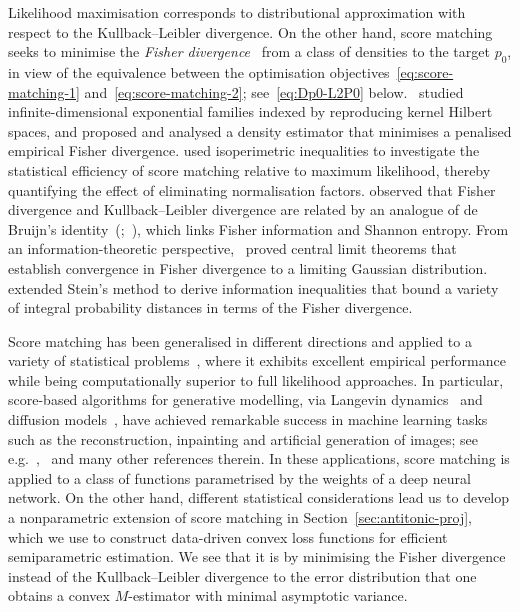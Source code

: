 \documentclass[a4paper]{article}
\theoremstyle{definition}
\begin{document}
Likelihood maximisation corresponds to distributional approximation with respect to the Kullback--Leibler divergence.  On the other hand, score matching seeks to minimise the \textit{Fisher divergence}~\citep[Section~1.3]{johnson2004information} from a class of densities to the target $p_0$, in view of the equivalence between the optimisation objectives~\eqref{eq:score-matching-1} and~\eqref{eq:score-matching-2}; see~\eqref{eq:Dp0-L2P0} below.~\citet{sriperumbudur2017density} studied infinite-dimensional exponential families indexed by reproducing kernel Hilbert spaces, and proposed and analysed a density estimator that minimises a penalised empirical Fisher divergence. \citet{koehler2022statistical} used isoperimetric inequalities to investigate the statistical efficiency of score matching relative to maximum likelihood, thereby quantifying the effect of eliminating normalisation factors. \citet{lyu2012interpretation}
observed that Fisher divergence and Kullback--Leibler divergence are related by an analogue of de Bruijn's identity~(\citealp[Appendix~C]{johnson2004information};~\citealp[Section~17.7]{cover2006elements}), which links Fisher information and Shannon entropy. From an information-theoretic perspective,~\citet{johnson2004fisher} proved central limit theorems that establish convergence in Fisher divergence to a limiting Gaussian distribution.~\citet{ley2013stein} extended Stein's method to derive information inequalities that bound a variety of integral probability distances in terms of the Fisher divergence.

Score matching has been generalised in different directions and applied to 
a variety of statistical problems~\citep[e.g.][]{hyvarinen2007extensions,vincent2011connection,lyu2012interpretation,mardia2016score,song2020sliced,yu2020simultaneous,yu2022generalized,lederer2023extremes,benton2024denoising,ghosh2025stein}, where it exhibits excellent empirical performance while being computationally superior to full likelihood approaches. In particular, score-based algorithms for generative modelling, via Langevin dynamics~\citep{song19generative} and diffusion models~\citep{song21score}, have achieved remarkable success in machine learning tasks such as the reconstruction, inpainting and artificial generation of images; see e.g.~\citet{jolicoeur2020adversarial},~\citet{bortoli2022riemannian} and many other references therein. In these applications, score matching is applied to a class of functions parametrised by the weights of a deep neural network. On the other hand, different statistical considerations lead us to develop a nonparametric extension of score matching in Section~\ref{sec:antitonic-proj}, which we use to construct data-driven convex loss functions for efficient semiparametric estimation. We see that it is by minimising the Fisher divergence instead of the Kullback--Leibler divergence to the error distribution that one obtains a convex $M$-estimator with minimal asymptotic variance.
\end{document}
